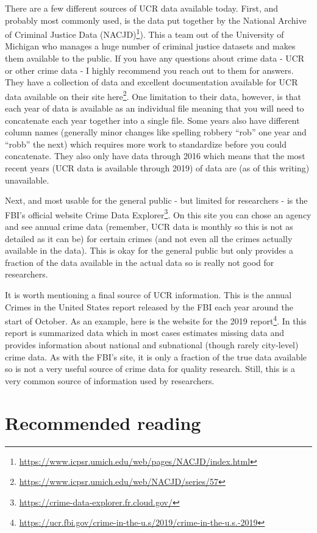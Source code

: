 \documentclass[
]{krantz}
\renewcommand{\href}[2]{#2\footnote{\url{#1}}}
\begin{document}
There are a few different sources of UCR data available
today. First, and probably most commonly used, is the data
put together by the
\href{https://www.icpsr.umich.edu/web/pages/NACJD/index.html}{National
Archive of Criminal Justice Data (NACJD)}). This a team out
of the University of Michigan who manages a huge number of
criminal justice datasets and makes them available to the
public. If you have any questions about crime data - UCR or
other crime data - I highly recommend you reach out to them
for answers. They have a collection of data and excellent
documentation available for UCR data available on their site
\href{https://www.icpsr.umich.edu/web/NACJD/series/57}{here}.
One limitation to their data, however, is that each year of
data is available as an individual file meaning that you
will need to concatenate each year together into a single
file. Some years also have different column names (generally
minor changes like spelling robbery ``rob'' one year and
``robb'' the next) which requires more work to standardize
before you could concatenate. They also only have data
through 2016 which means that the most recent years (UCR
data is available through 2019) of data are (as of this
writing) unavailable.

Next, and most usable for the general public - but limited
for researchers - is the FBI's official website
\href{https://crime-data-explorer.fr.cloud.gov/}{Crime Data
Explorer}. On this site you can chose an agency and see
annual crime data (remember, UCR data is monthly so this is
not as detailed as it can be) for certain crimes (and not
even all the crimes actually available in the data). This is
okay for the general public but only provides a fraction of
the data available in the actual data so is really not good
for researchers.

It is worth mentioning a final source of UCR information.
This is the annual Crimes in the United States report
released by the FBI each year around the start of October.
As an example, here is the
\href{https://ucr.fbi.gov/crime-in-the-u.s/2019/crime-in-the-u.s.-2019}{website
for the 2019 report}. In this report is summarized data
which in most cases estimates missing data and provides
information about national and subnational (though rarely
city-level) crime data. As with the FBI's site, it is only a
fraction of the true data available so is not a very useful
source of crime data for quality research. Still, this is a
very common source of information used by researchers.

\section{Recommended reading}\label{recommended-reading}
\end{document}
